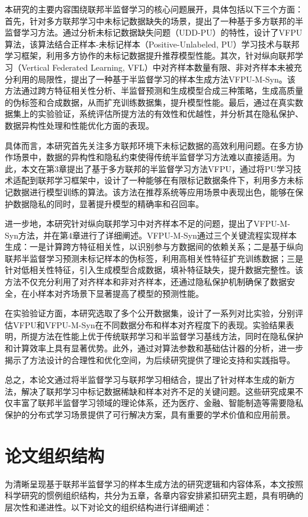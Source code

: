 本研究的主要内容围绕联邦半监督学习的核心问题展开，具体包括以下三个方面：首先，针对多方联邦学习中未标记数据缺失的场景，提出了一种基于多方联邦的半监督学习方法。通过分析未标记数据缺失问题（UDD-PU）的特性，设计了VFPU算法，该算法结合正样本-未标记样本（Positive-Unlabeled, PU）学习技术与联邦学习框架，利用多方协作的未标记数据提升推荐模型性能。其次，针对纵向联邦学习（Vertical Federated Learning, VFL）中对齐样本数量有限、非对齐样本未被充分利用的局限性，提出了一种基于半监督学习的样本生成方法VFPU-M-Syn。该方法通过跨方特征相关性分析、半监督预测和生成模型合成三种策略，生成高质量的伪标签和合成数据，从而扩充训练数据集，提升模型性能。最后，通过在真实数据集上的实验验证，系统评估所提方法的有效性和优越性，并分析其在隐私保护、数据异构性处理和性能优化方面的表现。

具体而言，本研究首先关注多方联邦环境下未标记数据的高效利用问题。在多方协作场景中，数据的异构性和隐私约束使得传统半监督学习方法难以直接适用。为此，本文在第3章提出了基于多方联邦的半监督学习方法VFPU，通过将PU学习技术适配到联邦学习框架中，设计了一种能够在有限标记数据条件下，利用多方未标记数据进行模型训练的算法。该方法在推荐系统等应用场景中表现出色，能够在保护数据隐私的同时，显著提升模型的精确率和召回率。

进一步地，本研究针对纵向联邦学习中对齐样本不足的问题，提出了VFPU-M-Syn方法，并在第4章进行了详细阐述。VFPU-M-Syn通过三个关键流程实现样本生成：一是计算跨方特征相关性，以识别参与方数据间的依赖关系；二是基于纵向联邦半监督学习预测未标记样本的伪标签，利用高相关性特征扩充训练数据；三是针对低相关性特征，引入生成模型合成数据，填补特征缺失，提升数据完整性。该方法不仅充分利用了对齐样本和非对齐样本，还通过隐私保护机制确保了数据安全，在小样本对齐场景下显著提高了模型的预测性能。

在实验验证方面，本研究选取了多个公开数据集，设计了一系列对比实验，分别评估VFPU和VFPU-M-Syn在不同数据分布和样本对齐程度下的表现。实验结果表明，所提方法在性能上优于传统联邦学习和半监督学习基线方法，同时在隐私保护和计算效率上具有显著优势。此外，通过对算法参数和基础估计器的分析，进一步揭示了方法设计的合理性和优化空间，为后续研究提供了理论支持和实践指导。

总之，本论文通过将半监督学习与联邦学习相结合，提出了针对样本生成的新方法，解决了联邦学习中标记数据稀缺和样本对齐不足的关键问题。这些研究成果不仅丰富了联邦半监督学习领域的理论体系，还为医疗、金融、智能制造等需要隐私保护的分布式学习场景提供了可行解决方案，具有重要的学术价值和应用前景。

\section{论文组织结构}
为清晰呈现基于联邦半监督学习的样本生成方法的研究逻辑和内容体系，本文按照科学研究的惯例组织结构，共分为五章，各章内容安排紧扣研究主题，具有明确的层次性和递进性。以下对论文的组织结构进行详细阐述：

